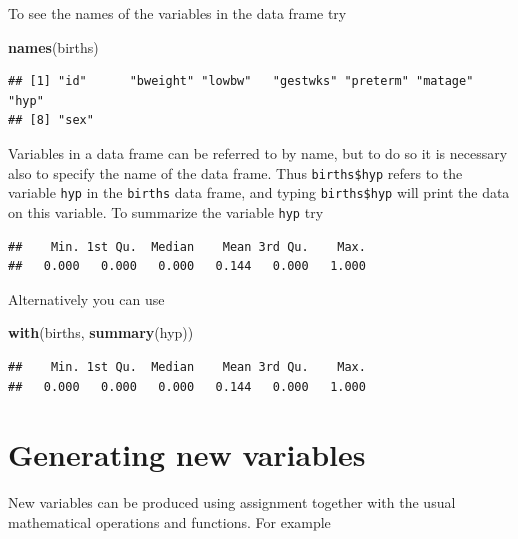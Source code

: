 \documentclass[
]{book}
\newenvironment{Shaded}{\begin{snugshade}}{\end{snugshade}}
\newcommand{\FunctionTok}[1]{\textcolor[rgb]{0.13,0.29,0.53}{\textbf{#1}}}
\newcommand{\NormalTok}[1]{#1}
\newcommand{\SpecialCharTok}[1]{\textcolor[rgb]{0.81,0.36,0.00}{\textbf{#1}}}
\theoremstyle{definition}
\theoremstyle{definition}
\theoremstyle{definition}
\theoremstyle{definition}
\theoremstyle{remark}
\begin{document}
To see the names of the variables in the data frame try

\begin{Shaded}
\begin{Highlighting}[]
\FunctionTok{names}\NormalTok{(births)}
\end{Highlighting}
\end{Shaded}

\begin{verbatim}
## [1] "id"      "bweight" "lowbw"   "gestwks" "preterm" "matage"  "hyp"    
## [8] "sex"
\end{verbatim}

Variables in a data frame can be referred to by name, but to do so
it is necessary also to specify the name of the data frame. Thus
\texttt{births\$hyp} refers to the variable \texttt{hyp} in the \texttt{births}
data frame, and typing \texttt{births\$hyp} will print the data on this
variable. To summarize the variable \texttt{hyp} try

\begin{Shaded}
\end{Shaded}

\begin{verbatim}
##    Min. 1st Qu.  Median    Mean 3rd Qu.    Max. 
##   0.000   0.000   0.000   0.144   0.000   1.000
\end{verbatim}

Alternatively you can use

\begin{Shaded}
\begin{Highlighting}[]
\FunctionTok{with}\NormalTok{(births, }\FunctionTok{summary}\NormalTok{(hyp))}
\end{Highlighting}
\end{Shaded}

\begin{verbatim}
##    Min. 1st Qu.  Median    Mean 3rd Qu.    Max. 
##   0.000   0.000   0.000   0.144   0.000   1.000
\end{verbatim}

\section{Generating new variables}\label{generating-new-variables}

New variables can be produced using assignment together with the usual
mathematical operations and functions. For example
\end{document}
